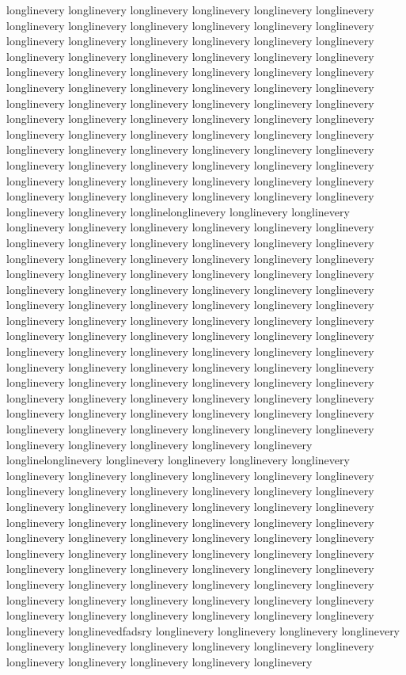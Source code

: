 {longlinevery longlinevery longlinevery longlinevery longlinevery longlinevery longlinevery longlinevery longlinevery longlinevery longlinevery longlinevery longlinevery longlinevery longlinevery longlinevery longlinevery longlinevery longlinevery longlinevery longlinevery longlinevery longlinevery longlinevery longlinevery longlinevery longlinevery longlinevery longlinevery longlinevery longlinevery longlinevery longlinevery longlinevery longlinevery longlinevery longlinevery longlinevery longlinevery longlinevery longlinevery longlinevery longlinevery longlinevery longlinevery longlinevery longlinevery longlinevery longlinevery longlinevery longlinevery longlinevery longlinevery longlinevery longlinevery longlinevery longlinevery longlinevery longlinevery longlinevery longlinevery longlinevery longlinevery longlinevery longlinevery longlinevery longlinevery longlinevery longlinevery longlinevery longlinevery longlinevery longlinevery longlinevery longlinevery longlinevery longlinevery longlinevery longlinevery longlinevery longlinelonglinevery longlinevery longlinevery longlinevery longlinevery longlinevery longlinevery longlinevery longlinevery longlinevery longlinevery longlinevery longlinevery longlinevery longlinevery longlinevery longlinevery longlinevery longlinevery longlinevery longlinevery longlinevery longlinevery longlinevery longlinevery longlinevery longlinevery longlinevery longlinevery longlinevery longlinevery longlinevery longlinevery longlinevery longlinevery longlinevery longlinevery longlinevery longlinevery longlinevery longlinevery longlinevery longlinevery longlinevery longlinevery longlinevery longlinevery longlinevery longlinevery longlinevery longlinevery longlinevery longlinevery longlinevery longlinevery longlinevery longlinevery longlinevery longlinevery longlinevery longlinevery longlinevery longlinevery longlinevery longlinevery longlinevery longlinevery longlinevery longlinevery longlinevery longlinevery longlinevery longlinevery longlinevery longlinevery longlinevery longlinevery longlinevery longlinevery longlinevery longlinevery longlinevery longlinevery longlinevery longlinevery longlinevery longlinevery longlinevery longlinevery longlinevery longlinevery longlinevery longlinelonglinevery longlinevery longlinevery longlinevery longlinevery longlinevery longlinevery longlinevery longlinevery longlinevery longlinevery longlinevery longlinevery longlinevery longlinevery longlinevery longlinevery longlinevery longlinevery longlinevery longlinevery longlinevery longlinevery longlinevery longlinevery longlinevery longlinevery longlinevery longlinevery longlinevery longlinevery longlinevery longlinevery longlinevery longlinevery longlinevery longlinevery longlinevery longlinevery longlinevery longlinevery longlinevery longlinevery longlinevery longlinevery longlinevery longlinevery longlinevery longlinevery longlinevery longlinevery longlinevery longlinevery longlinevery longlinevery longlinevery longlinevery longlinevery longlinevery longlinevery longlinevery longlinevery longlinevery longlinevery longlinevery longlinevery longlinevedfadsry longlinevery longlinevery longlinevery longlinevery longlinevery longlinevery longlinevery longlinevery longlinevery longlinevery longlinevery longlinevery longlinevery longlinevery longlinevery }
